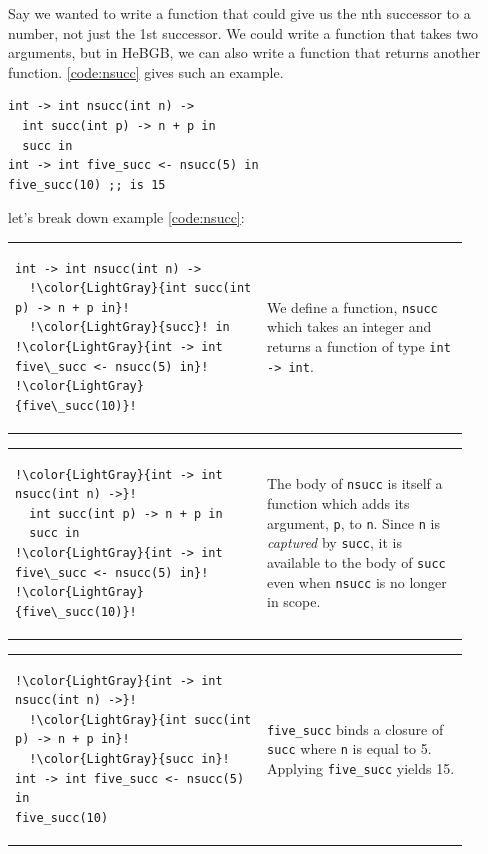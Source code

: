 \documentclass[12pt]{article}
\begin{document}
Say we wanted to write a function that could give us the nth successor
to a number, not just the 1st successor. We could write a function that
takes two arguments, but in HeBGB, we can also write a function that
returns another function. \ref{code:nsucc} gives such an example.
\begin{code_box}
\label{code:nsucc}
\begin{lstlisting}[language=HeBGB]
int -> int nsucc(int n) ->
  int succ(int p) -> n + p in
  succ in
int -> int five_succ <- nsucc(5) in
five_succ(10) ;; is 15
\end{lstlisting}
\end{code_box}
let's break down example \ref{code:nsucc}:\\
\begin{tabular}{p{0.5\linewidth} p{0.4\linewidth}}
\begin{lstlisting}[language=HeBGB, escapechar=!]
int -> int nsucc(int n) ->
  !\color{LightGray}{int succ(int p) -> n + p in}!
  !\color{LightGray}{succ}! in
!\color{LightGray}{int -> int five\_succ <- nsucc(5) in}!
!\color{LightGray}{five\_succ(10)}!
\end{lstlisting} & 
We define a function, \texttt{nsucc} which takes an integer and
returns a function of type \texttt{int -> int}.
\\
\end{tabular}

\noindent
\begin{tabular}{p{0.5\linewidth} p{0.4\linewidth}}
\begin{lstlisting}[language=HeBGB, escapechar=!]
!\color{LightGray}{int -> int nsucc(int n) ->}!
  int succ(int p) -> n + p in
  succ in
!\color{LightGray}{int -> int five\_succ <- nsucc(5) in}!
!\color{LightGray}{five\_succ(10)}!
\end{lstlisting} & 
The body of \texttt{nsucc} is itself a function
which adds its argument, \texttt{p}, to \texttt{n}. Since \texttt{n} 
is \textit{captured} by \texttt{succ}, it is available to the body
of \texttt{succ} even when \texttt{nsucc} is no longer in scope.
\\
\end{tabular}

\noindent
\begin{tabular}{p{0.5\linewidth} p{0.4\linewidth}}
\begin{lstlisting}[language=HeBGB, escapechar=!]
!\color{LightGray}{int -> int nsucc(int n) ->}!
  !\color{LightGray}{int succ(int p) -> n + p in}!
  !\color{LightGray}{succ in}!
int -> int five_succ <- nsucc(5) in
five_succ(10)
\end{lstlisting} & 
\texttt{five\_succ} binds a closure of \texttt{succ} where \texttt{n} is
equal to 5. Applying \texttt{five\_succ} yields 15.
\\
\end{tabular}
\end{document}
